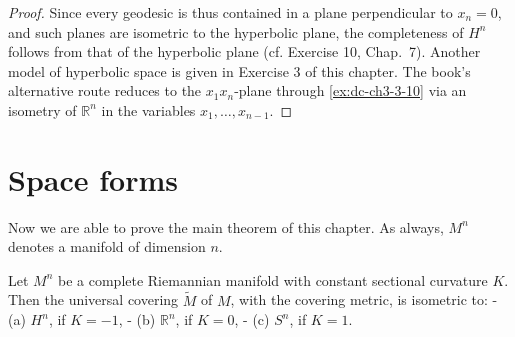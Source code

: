 \begin{proof}
  Since every geodesic is thus contained in a plane perpendicular to $x_n=0$, and such
  planes are isometric to the hyperbolic plane, the completeness of $H^n$ follows from
  that of the hyperbolic plane (cf. Exercise 10, Chap.~7). Another model of hyperbolic
  space is given in Exercise 3 of this chapter. The book's alternative route reduces to
  the $x_1x_n$-plane through \cref{ex:dc-ch3-3-10} via an isometry of $\mathbb R^n$ in
  the variables $x_1,\dots,x_{n-1}$.
\end{proof}

\section{Space forms}

Now we are able to prove the main theorem of this chapter. As always, $M^n$
denotes a manifold of dimension $n$.

\begin{theorem}
  \label{thm:dc-ch8-4-1}
  \notready
  Let $M^n$ be a complete Riemannian manifold with constant sectional curvature $K$.
  Then the universal covering $\tilde{M}$ of $M$, with the covering metric, is
  isometric to:
  - (a) $H^n$, if $K=-1$,
  - (b) $\mathbb{R}^n$, if $K=0$,
  - (c) $S^n$, if $K=1$.
\end{theorem}


